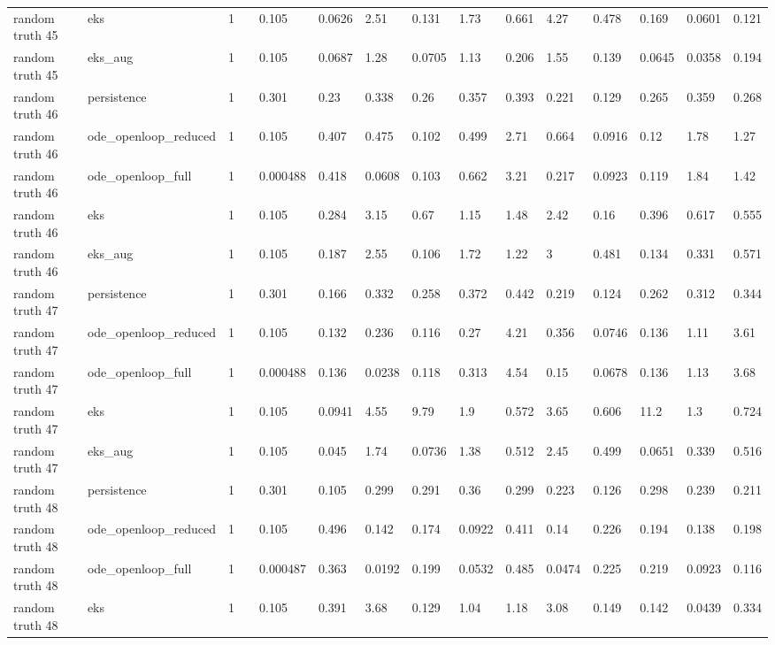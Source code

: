 \begin{table}[t]
\begin{tabular}{lllllllllllllll}
random truth 45 & eks & 1 &  & 0.105 & 0.0626 & 2.51 & 0.131 & 1.73 & 0.661 & 4.27 & 0.478 & 0.169 & 0.0601 & 0.121 \\
random truth 45 & eks\_aug & 1 &  & 0.105 & 0.0687 & 1.28 & 0.0705 & 1.13 & 0.206 & 1.55 & 0.139 & 0.0645 & 0.0358 & 0.194 \\
random truth 46 & persistence & 1 &  & 0.301 & 0.23 & 0.338 & 0.26 & 0.357 & 0.393 & 0.221 & 0.129 & 0.265 & 0.359 & 0.268 \\
random truth 46 & ode\_openloop\_reduced & 1 &  & 0.105 & 0.407 & 0.475 & 0.102 & 0.499 & 2.71 & 0.664 & 0.0916 & 0.12 & 1.78 & 1.27 \\
random truth 46 & ode\_openloop\_full & 1 &  & 0.000488 & 0.418 & 0.0608 & 0.103 & 0.662 & 3.21 & 0.217 & 0.0923 & 0.119 & 1.84 & 1.42 \\
random truth 46 & eks & 1 &  & 0.105 & 0.284 & 3.15 & 0.67 & 1.15 & 1.48 & 2.42 & 0.16 & 0.396 & 0.617 & 0.555 \\
random truth 46 & eks\_aug & 1 &  & 0.105 & 0.187 & 2.55 & 0.106 & 1.72 & 1.22 & 3 & 0.481 & 0.134 & 0.331 & 0.571 \\
random truth 47 & persistence & 1 &  & 0.301 & 0.166 & 0.332 & 0.258 & 0.372 & 0.442 & 0.219 & 0.124 & 0.262 & 0.312 & 0.344 \\
random truth 47 & ode\_openloop\_reduced & 1 &  & 0.105 & 0.132 & 0.236 & 0.116 & 0.27 & 4.21 & 0.356 & 0.0746 & 0.136 & 1.11 & 3.61 \\
random truth 47 & ode\_openloop\_full & 1 &  & 0.000488 & 0.136 & 0.0238 & 0.118 & 0.313 & 4.54 & 0.15 & 0.0678 & 0.136 & 1.13 & 3.68 \\
random truth 47 & eks & 1 &  & 0.105 & 0.0941 & 4.55 & 9.79 & 1.9 & 0.572 & 3.65 & 0.606 & 11.2 & 1.3 & 0.724 \\
random truth 47 & eks\_aug & 1 &  & 0.105 & 0.045 & 1.74 & 0.0736 & 1.38 & 0.512 & 2.45 & 0.499 & 0.0651 & 0.339 & 0.516 \\
random truth 48 & persistence & 1 &  & 0.301 & 0.105 & 0.299 & 0.291 & 0.36 & 0.299 & 0.223 & 0.126 & 0.298 & 0.239 & 0.211 \\
random truth 48 & ode\_openloop\_reduced & 1 &  & 0.105 & 0.496 & 0.142 & 0.174 & 0.0922 & 0.411 & 0.14 & 0.226 & 0.194 & 0.138 & 0.198 \\
random truth 48 & ode\_openloop\_full & 1 &  & 0.000487 & 0.363 & 0.0192 & 0.199 & 0.0532 & 0.485 & 0.0474 & 0.225 & 0.219 & 0.0923 & 0.116 \\
random truth 48 & eks & 1 &  & 0.105 & 0.391 & 3.68 & 0.129 & 1.04 & 1.18 & 3.08 & 0.149 & 0.142 & 0.0439 & 0.334 \\

\end{tabular}
\end{table}
